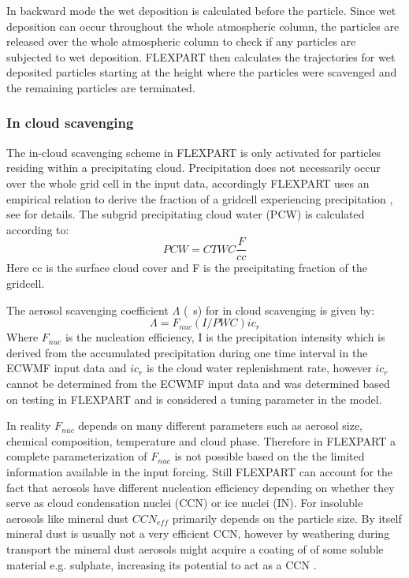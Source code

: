 In backward mode the wet deposition is calculated before the particle. Since wet deposition can occur throughout the whole atmospheric column, the particles are released over the whole atmospheric column to check if any particles are subjected to wet deposition. FLEXPART then calculates the trajectories for wet deposited particles starting at the height where the particles were scavenged and the remaining particles are terminated.    
\subsubsection{In cloud scavenging}
The in-cloud scavenging scheme in FLEXPART is only activated for particles residing within a precipitating cloud. Precipitation does not necessarily occur over the whole grid cell in the input data, accordingly FLEXPART uses an empirical relation to derive the fraction of a gridcell experiencing precipitation , see \textcite{Flexpart-2005_ref_paper} for details. The subgrid precipitating cloud water (PCW) is calculated according to: 
\begin{equation}
    PCW = CTWC\frac{F}{cc}
\end{equation}
Here cc is the surface cloud cover and F is the precipitating fraction of the gridcell. 

The aerosol scavenging coefficient $\Lambda$ (\si{\per\s}) for in cloud scavenging is given by:
\begin{equation}
    \Lambda = F_{nuc}\left(I/PWC\right)ic_r
\end{equation}
Where $F_{nuc}$ is the nucleation efficiency, I is the precipitation intensity which is derived from the accumulated precipitation during one time interval in the ECWMF input data and $ic_r$ is the cloud water replenishment rate,  however $ic_r$ cannot be determined from the ECWMF input data and was determined based on testing in FLEXPART and is considered a tuning parameter in the model.   

In reality $F_{nuc}$ depends on many different parameters such as aerosol size, chemical composition, temperature and cloud phase. Therefore in FLEXPART a complete parameterization of $F_{nuc}$ is not possible based on the the limited information available in the input forcing. Still FLEXPART can account for the fact that aerosols have different nucleation efficiency depending on whether they serve as cloud condensation nuclei (CCN) or ice nuclei (IN). For insoluble aerosols like mineral dust $CCN_{eff}$ primarily depends on the particle size. By itself mineral dust is usually not a very efficient CCN, however by weathering during transport the mineral dust aerosols might acquire a coating of of some soluble material e.g. sulphate, increasing its potential to act as a CCN \textcite{Dust_aerosols_coating2001}.     

